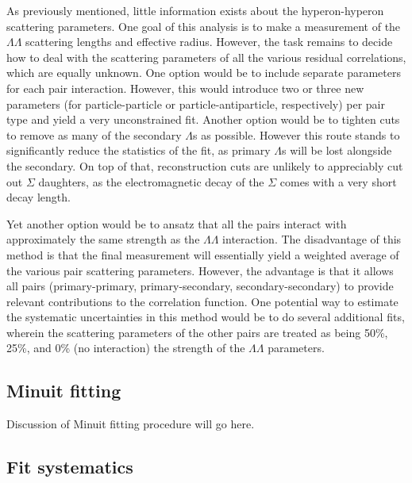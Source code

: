As previously mentioned, little information exists about the hyperon-hyperon scattering parameters.  One goal of this analysis is to make a measurement of the $\Lambda\Lambda$ scattering lengths and effective radius.  However, the task remains to decide how to deal with the scattering parameters of all the various residual correlations, which are equally unknown.  One option would be to include separate parameters for each pair interaction.  However, this would introduce two or three new parameters (for particle-particle or particle-antiparticle, respectively) per pair type and yield a very unconstrained fit.  Another option would be to tighten cuts to remove as many of the secondary $\Lambda$s as possible.  However this route stands to significantly reduce the statistics of the fit, as primary $\Lambda$s will be lost alongside the secondary.  On top of that, reconstruction cuts are unlikely to appreciably cut out $\Sigma$ daughters, as the electromagnetic decay of the $\Sigma$ comes with a very short decay length.

Yet another option would be to ansatz that all the pairs interact with approximately the same strength as the $\Lambda\Lambda$ interaction.  The disadvantage of this method is that the final measurement will essentially yield a weighted average of the various pair scattering parameters.  However, the advantage is that it allows all pairs (primary-primary, primary-secondary, secondary-secondary) to provide relevant contributions to the correlation function.  One potential way to estimate the systematic uncertainties in this method would be to do several additional fits, wherein the scattering parameters of the other pairs are treated as being 50\%, 25\%, and 0\% (no interaction) the strength of the $\Lambda\Lambda$ parameters.

\subsection{Minuit fitting}
\label{sec:MinuitFit}

Discussion of Minuit fitting procedure will go here.

\subsection{Fit systematics}
\label{sec:FitSystematics}

